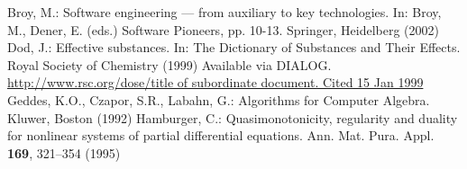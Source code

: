 %
%
% 
% 
%

\begin{thebibliography}{99.}%
     Broy, M.: Software engineering --- from auxiliary to key technologies. In: Broy, M., Dener, E. (eds.) Software Pioneers, pp. 10-13. Springer, Heidelberg (2002)
     Dod, J.: Effective substances. In: The Dictionary of Substances and Their Effects. Royal Society of Chemistry (1999) Available via DIALOG. \\
    \url{http://www.rsc.org/dose/title of subordinate document. Cited 15 Jan 1999}
     Geddes, K.O., Czapor, S.R., Labahn, G.: Algorithms for Computer Algebra. Kluwer, Boston (1992)
     Hamburger, C.: Quasimonotonicity, regularity and duality for nonlinear systems of partial differential equations. Ann. Mat. Pura. Appl. \textbf{169}, 321--354 (1995)
\end{thebibliography}